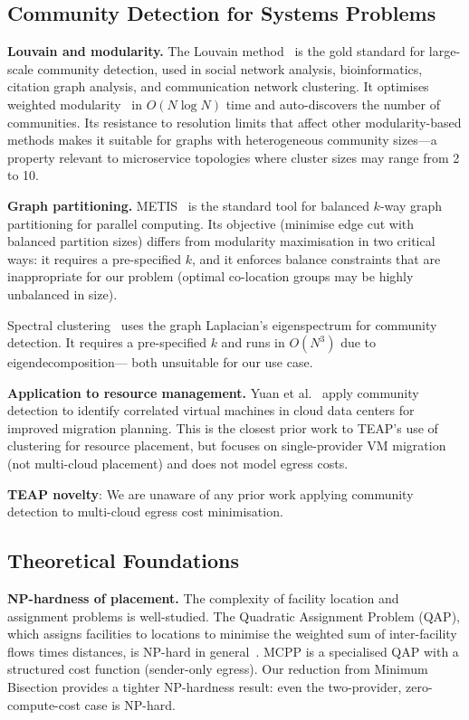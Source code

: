 \documentclass[10pt,journal]{IEEEtran}
\begin{document}
\subsection{Community Detection for Systems Problems}

\textbf{Louvain and modularity.}
The Louvain method~\cite{blondel2008} is the gold standard for large-scale
community detection, used in social network analysis, bioinformatics,
citation graph analysis, and communication network clustering.
It optimises weighted modularity~\cite{newman2004} in $O(N\log N)$ time
and auto-discovers the number of communities.
Its resistance to resolution limits that affect other modularity-based methods
makes it suitable for graphs with heterogeneous community sizes---a property
relevant to microservice topologies where cluster sizes may range from 2 to 10.

\textbf{Graph partitioning.}
METIS~\cite{karypis1998} is the standard tool for balanced $k$-way graph
partitioning for parallel computing.
Its objective (minimise edge cut with balanced partition sizes) differs from
modularity maximisation in two critical ways: it requires a pre-specified $k$,
and it enforces balance constraints that are inappropriate for our problem
(optimal co-location groups may be highly unbalanced in size).

Spectral clustering~\cite{vonluxburg2007} uses the graph Laplacian's eigenspectrum
for community detection.
It requires a pre-specified $k$ and runs in $O(N^3)$ due to eigendecomposition---
both unsuitable for our use case.

\textbf{Application to resource management.}
Yuan et al.~\cite{yuan2017} apply community detection to identify correlated
virtual machines in cloud data centers for improved migration planning.
This is the closest prior work to TEAP's use of clustering for resource
placement, but focuses on single-provider VM migration (not multi-cloud
placement) and does not model egress costs.

\textbf{TEAP novelty}: We are unaware of any prior work applying community
detection to multi-cloud egress cost minimisation.

\subsection{Theoretical Foundations}

\textbf{NP-hardness of placement.}
The complexity of facility location and assignment problems is well-studied.
The Quadratic Assignment Problem (QAP), which assigns facilities to locations
to minimise the weighted sum of inter-facility flows times distances, is NP-hard
in general~\cite{garey1979}.
MCPP is a specialised QAP with a structured cost function (sender-only egress).
Our reduction from Minimum Bisection provides a tighter NP-hardness result:
even the two-provider, zero-compute-cost case is NP-hard.
\end{document}
